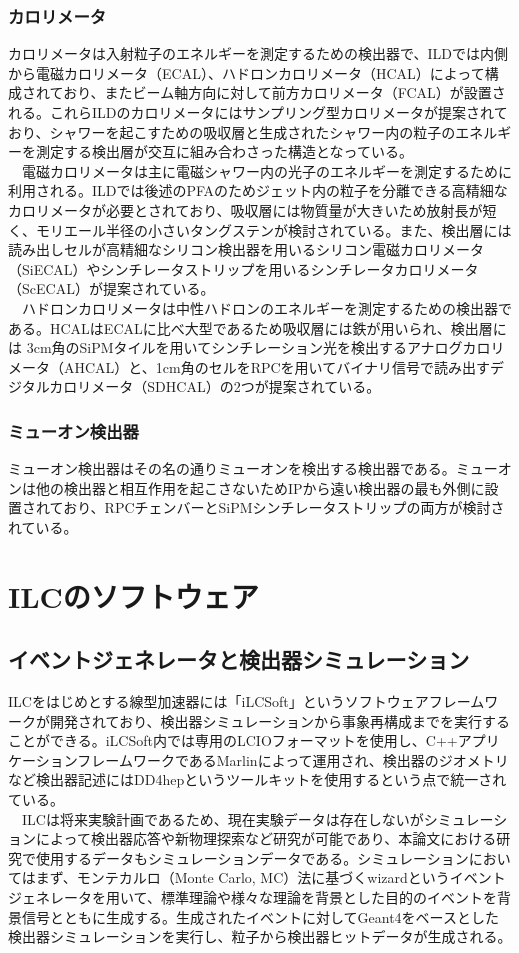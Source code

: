 \subsubsection{カロリメータ}
カロリメータは入射粒子のエネルギーを測定するための検出器で、ILDでは内側から電磁カロリメータ（ECAL）、ハドロンカロリメータ（HCAL）によって構成されており、またビーム軸方向に対して前方カロリメータ（FCAL）が設置される。これらILDのカロリメータにはサンプリング型カロリメータが提案されており、シャワーを起こすための吸収層と生成されたシャワー内の粒子のエネルギーを測定する検出層が交互に組み合わさった構造となっている。\\
　電磁カロリメータは主に電磁シャワー内の光子のエネルギーを測定するために利用される。ILDでは後述のPFAのためジェット内の粒子を分離できる高精細なカロリメータが必要とされており、吸収層には物質量が大きいため放射長が短く、モリエール半径の小さいタングステンが検討されている。また、検出層には読み出しセルが高精細なシリコン検出器を用いるシリコン電磁カロリメータ（SiECAL）やシンチレータストリップを用いるシンチレータカロリメータ（ScECAL）が提案されている。\\
　ハドロンカロリメータは中性ハドロンのエネルギーを測定するための検出器である。HCALはECALに比べ大型であるため吸収層には鉄が用いられ、検出層には 3cm角のSiPMタイルを用いてシンチレーション光を検出するアナログカロリメータ（AHCAL）と、1cm角のセルをRPCを用いてバイナリ信号で読み出すデジタルカロリメータ（SDHCAL）の2つが提案されている。
\subsubsection{ミューオン検出器}
ミューオン検出器はその名の通りミューオンを検出する検出器である。ミューオンは他の検出器と相互作用を起こさないためIPから遠い検出器の最も外側に設置されており、RPCチェンバーとSiPMシンチレータストリップの両方が検討されている。

\section{ILCのソフトウェア}
\subsection{イベントジェネレータと検出器シミュレーション}
ILCをはじめとする線型加速器には「iLCSoft」というソフトウェアフレームワークが開発されており、検出器シミュレーションから事象再構成までを実行することができる。iLCSoft内では専用のLCIOフォーマットを使用し、C++アプリケーションフレームワークであるMarlinによって運用され、検出器のジオメトリなど検出器記述にはDD4hepというツールキットを使用するという点で統一されている。\\
　ILCは将来実験計画であるため、現在実験データは存在しないがシミュレーションによって検出器応答や新物理探索など研究が可能であり、本論文における研究で使用するデータもシミュレーションデータである。シミュレーションにおいてはまず、モンテカルロ（Monte Carlo, MC）法に基づくwizardというイベントジェネレータを用いて、標準理論や様々な理論を背景とした目的のイベントを背景信号とともに生成する。生成されたイベントに対してGeant4をベースとした検出器シミュレーションを実行し、粒子から検出器ヒットデータが生成される。
